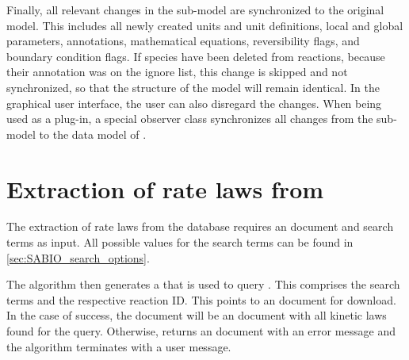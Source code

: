 Finally, all relevant changes in the sub-model are synchronized to the original model.
This includes all newly created units and unit definitions, local and global parameters, annotations, mathematical equations, reversibility flags, and boundary condition flags.
If species have been deleted from reactions, because their \MIRIAM annotation was on the ignore list, this change is skipped and not synchronized, so that the structure of the model will remain identical.
In the graphical user interface, the user can also disregard the changes.
When being used as a \CellDesigner plug-in, a special observer class synchronizes all changes from the sub-model to the data model of \CellDesigner.

\section{Extraction of rate laws from \SABIO}

The extraction of rate laws from the database \SABIO requires an \SBML document and search terms as input.
All possible values for the search terms can be found in \cref{sec:SABIO_search_options}.

The algorithm then generates a \URL that is used to query \SABIO.
This \URL comprises the search terms and the respective \KEGG reaction \ac{ID}.
This \URL points to an \XML document for download.
In the case of success, the \XML document will be an \SBML document with all kinetic laws found for the query.
Otherwise, \SABIO returns an \XML document with an error message and the algorithm terminates with a user message.

